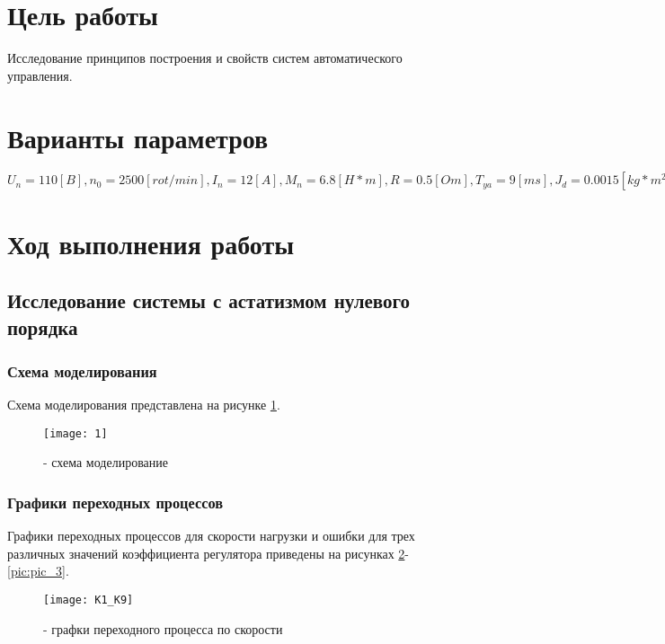 







\section{Цель работы}
Исследование принципов построения и свойств систем автоматического управления.

\section{Варианты параметров}

$U_n = 110 [B], n_0 = 2500 [rot/min], I_n = 12 [A], M_n = 6.8 [H*m], R = 0.5 [Om], T_{ya} = 9 [ms], J_d=0.0015 [kg*m^2], T_y=5[ms], i_p = 40, J_m = 1.2[kg*m^2]$


\section{Ход выполнения работы}

\subsection{Исследование системы с астатизмом нулевого порядка}

\subsubsection{Схема моделирования}
Схема моделирования представлена на рисунке \ref{pic:pic_1}.
\begin{figure}[H]
	\begin{center}
		\texttt{[image: 1]}
		\caption{- схема моделирование} 
		\label{pic:pic_1} %
	\end{center}
\end{figure}

\newpage

\subsubsection{Графики переходных процессов}
Графики переходных процессов для скорости нагрузки и ошибки для трех различных значений коэффициента регулятора приведены на рисунках \ref{pic:pic_2}-\ref{pic:pic_3}.
\begin{figure}[H]
	\begin{center}
		\texttt{[image: K1\_K9]}
		\caption{- графки переходного процесса по скорости} 
		\label{pic:pic_2} %
	\end{center}
\end{figure}

